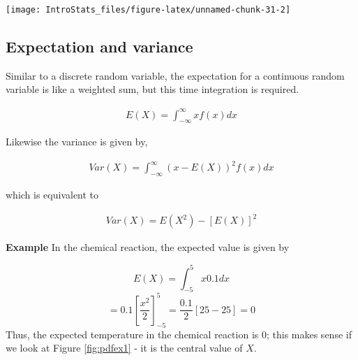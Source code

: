 \documentclass[
  oneside]{krantz}
\newenvironment{Shaded}{\begin{snugshade}}{\end{snugshade}}
\newcommand{\AttributeTok}[1]{\textcolor[rgb]{0.77,0.63,0.00}{#1}}
\newcommand{\CommentTok}[1]{\textcolor[rgb]{0.56,0.35,0.01}{\textit{#1}}}
\newcommand{\DecValTok}[1]{\textcolor[rgb]{0.00,0.00,0.81}{#1}}
\newcommand{\FunctionTok}[1]{\textcolor[rgb]{0.00,0.00,0.00}{#1}}
\newcommand{\NormalTok}[1]{#1}
\newcommand{\OtherTok}[1]{\textcolor[rgb]{0.56,0.35,0.01}{#1}}
\newcommand{\SpecialCharTok}[1]{\textcolor[rgb]{0.00,0.00,0.00}{#1}}
\newcommand{\StringTok}[1]{\textcolor[rgb]{0.31,0.60,0.02}{#1}}
\begin{document}
\begin{Shaded}
\end{Shaded}

\begin{center}\texttt{[image: IntroStats\_files/figure-latex/unnamed-chunk-31-2]} \end{center}

\hypertarget{expectation-and-variance-1}{%
\subsection{Expectation and variance}\label{expectation-and-variance-1}}

Similar to a discrete random variable, the expectation for a continuous random variable is like a weighted sum, but this time integration is required.

\begin{align}
E(X) = \int_{-\infty}^{\infty}xf(x)dx
\end{align}

Likewise the variance is given by,

\begin{align}
Var(X) = \int_{-\infty}^{\infty}(x - E(X))^2f(x)dx
\end{align}

which is equivalent to

\begin{align}
Var(X) = E(X^2) - [E(X)]^2
\end{align}

\textbf{Example} In the chemical reaction, the expected value is given by

\[E(X) = \int_{-5}^{5} x0.1 dx\]
\[ =0.1[\frac{x^2}{2}]_{-5}^{5} = \frac{0.1}{2}[25 - 25] = 0 \]
Thus, the expected temperature in the chemical reaction is 0; this makes sense if we look at Figure \ref{fig:pdfex1} - it is the central value of \(X\).
\end{document}
